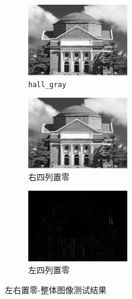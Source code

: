 \documentclass{article}
\numberwithin{figure}{section}
\numberwithin{table}{section}
\numberwithin{listing}{section}
\numberwithin{equation}{section}
\begin{document}
\begin{enumerate}
                \begin{figure}[H]
                    \centering
                    \begin{subfigure}{\textwidth}
                        \centering
                        \includegraphics[width=0.6\linewidth]{hall_gray}
                        \caption{\texttt{hall\_gray}}
                    \end{subfigure}
                    \begin{subfigure}{\textwidth}
                        \centering
                        \includegraphics[width=0.6\linewidth]{hall_gray_rightzero}
                        \caption{右四列置零}
                    \end{subfigure}
                    \begin{subfigure}{\textwidth}
                        \centering
                        \includegraphics[width=0.6\linewidth]{hall_gray_leftzero}
                        \caption{左四列置零}
                    \end{subfigure}
                    \caption{左右置零-整体图像测试结果}
                    \label{fig:rlzero}
                \end{figure}


\end{enumerate}
\end{document}
